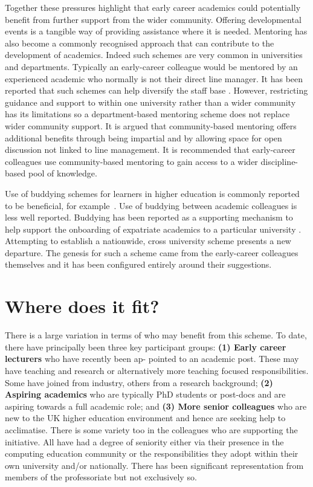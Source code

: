 \documentclass[sigconf]{acmart}
\begin{document}
Together these pressures highlight that early career academics could potentially benefit from further support from the wider community. Offering developmental events is a tangible way of providing assistance where it is needed. Mentoring has also become a commonly recognised approach that can contribute to the development of academics. Indeed such schemes are very common in universities and departments. Typically an early-career colleague would be mentored by an experienced academic who normally is not their direct line manager. It has been reported that such schemes can help diversify the staff base \cite{Golubchik2018}. However, restricting guidance and support to within one university rather than a wider community has its limitations \cite{Golubchik2018} so a department-based mentoring scheme does not replace wider community support.  It is argued that community-based mentoring offers additional benefits through being impartial and by allowing space for open discussion not linked to line management. It is recommended that early-career colleagues use community-based mentoring to gain access to a wider discipline-based pool of knowledge. 

Use of buddying schemes for learners in higher education is commonly reported to be beneficial, for example~\cite{Hayes2020,May20}. Use of buddying between academic colleagues is less well reported. Buddying has been reported as a supporting mechanism to help support the onboarding of expatriate academics to a particular university \cite{Wilkins2019}. Attempting to establish a nationwide, cross university scheme presents a new departure. The genesis for such a scheme came from the early-career colleagues themselves and it has been configured entirely around their suggestions.
	
\section{Where does it fit?}

There is a large variation in terms of who may benefit from this scheme. To date, there have principally been three key participant groups: \textbf{(1) Early career lecturers} who have recently been ap- pointed to an academic post. These may have teaching and research or alternatively more teaching focused responsibilities. Some have joined from industry, others from a research background; \textbf{(2) Aspiring academics }who are typically PhD students or post-docs and are aspiring towards a full academic role; and \textbf{ (3) More senior colleagues} who are new to the UK higher education environment and hence are seeking help to acclimatise. There is some variety too in the colleagues who are supporting the initiative. All have had a degree of seniority either via their presence in the computing education community or the responsibilities they adopt within their own university and/or nationally. There has been significant representation from members of the professoriate but not exclusively so. 
\end{document}
